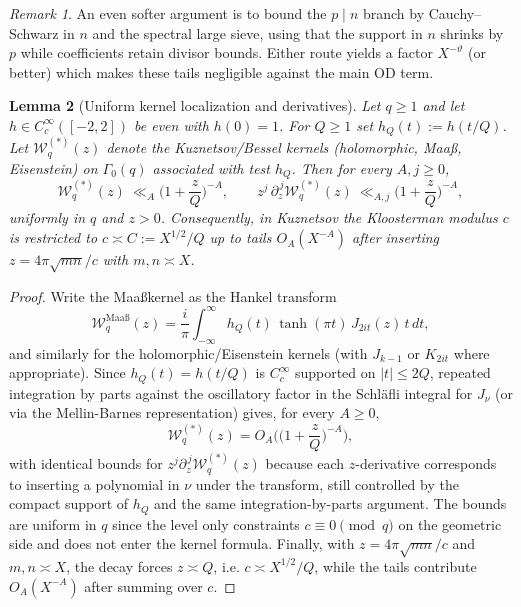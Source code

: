 \documentclass[11pt]{article}
\newtheorem{lemma}{Lemma}[part]
\theoremstyle{definition}
\theoremstyle{remark}
\newtheorem{remark}[lemma]{Remark}
\numberwithin{equation}{part}
\begin{document}
\begin{remark}
	An even softer argument is to bound the $p\mid n$ branch by Cauchy--Schwarz in $n$ and the spectral large sieve, using that the support in $n$ shrinks by $p$ while coefficients retain divisor bounds. Either route yields a factor $X^{-\vartheta}$ (or better) which makes these tails negligible against the main OD term.
\end{remark}


\begin{lemma}[Uniform kernel localization and derivatives]\label{lem:kernel-localization}
	Let $q\ge 1$ and let $h\in C_c^\infty([-2,2])$ be even with $h(0)=1$. For $Q\ge 1$ set $h_Q(t):=h(t/Q)$. Let $\mathcal W_q^{(*)}(z)$ denote the Kuznetsov/Bessel kernels (holomorphic, Maaß, Eisenstein) on $\Gamma_0(q)$ associated with test $h_Q$. Then for every $A,j\ge 0$,
	\[
		\mathcal W_q^{(*)}(z)\ \ll_A \Big(1+\frac{z}{Q}\Big)^{-A},\qquad
		z^j\,\partial_z^{\,j}\mathcal W_q^{(*)}(z)\ \ll_{A,j}\Big(1+\frac{z}{Q}\Big)^{-A},
	\]
	uniformly in $q$ and $z>0$. Consequently, in Kuznetsov the Kloosterman modulus $c$ is restricted to $c\asymp C:=X^{1/2}/Q$ up to tails $O_A(X^{-A})$ after inserting $z=4\pi\sqrt{mn}/c$ with $m,n\asymp X$.
\end{lemma}

\begin{proof}
	Write the Maa\ss kernel as the Hankel transform
	\[
		\mathcal W_q^{\mathrm{Maa\text{\ss}}}(z) = \frac{i}{\pi}\int_{-\infty}^{\infty} h_Q(t)\,\tanh(\pi t)\,J_{2it}(z)\,t\,dt,
	\]
	and similarly for the holomorphic/Eisenstein kernels (with $J_{k-1}$ or $K_{2it}$ where appropriate). Since $h_Q(t)=h(t/Q)$ is $C_c^\infty$ supported on $|t|\le 2Q$, repeated integration by parts against the oscillatory factor in the Schl\"afli integral for $J_\nu$ (or via the Mellin-Barnes representation) gives, for every $A\ge 0$,
	\[
		\mathcal W_q^{(*)}(z)=O_A\!\Big(\Big(1+\frac{z}{Q}\Big)^{-A}\Big),
	\]
	with identical bounds for $z^j\partial_z^{\,j}\mathcal W_q^{(*)}(z)$ because each $z$-derivative corresponds to inserting a polynomial in $\nu$ under the transform, still controlled by the compact support of $h_Q$ and the same integration-by-parts argument. The bounds are uniform in $q$ since the level only constraints $c\equiv 0\pmod q$ on the geometric side and does not enter the kernel formula.
	Finally, with $z=4\pi\sqrt{mn}/c$ and $m,n\asymp X$, the decay forces $z\asymp Q$, i.e. $c\asymp X^{1/2}/Q$, while the tails contribute $O_A(X^{-A})$ after summing over $c$.
\end{proof}
\end{document}

